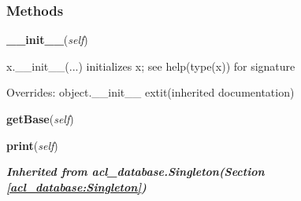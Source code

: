   \subsubsection{Methods}

    \vspace{0.5ex}

\hspace{.8\funcindent}\begin{boxedminipage}{\funcwidth}

    \raggedright \textbf{\_\_init\_\_}(\textit{self})

\setlength{\parskip}{2ex}
    x.\_\_init\_\_(...) initializes x; see help(type(x)) for signature

\setlength{\parskip}{1ex}
      Overrides: object.\_\_init\_\_ 	extit{(inherited documentation)}

    \end{boxedminipage}

    \label{acl_database:Database:getBase}

    \vspace{0.5ex}

\hspace{.8\funcindent}\begin{boxedminipage}{\funcwidth}

    \raggedright \textbf{getBase}(\textit{self})

\setlength{\parskip}{2ex}
\setlength{\parskip}{1ex}
    \end{boxedminipage}

    \label{acl_database:Database:print}

    \vspace{0.5ex}

\hspace{.8\funcindent}\begin{boxedminipage}{\funcwidth}

    \raggedright \textbf{print}(\textit{self})

\setlength{\parskip}{2ex}
\setlength{\parskip}{1ex}
    \end{boxedminipage}


\large{\textbf{\textit{Inherited from acl\_database.Singleton\textit{(Section \ref{acl_database:Singleton})}}}}

